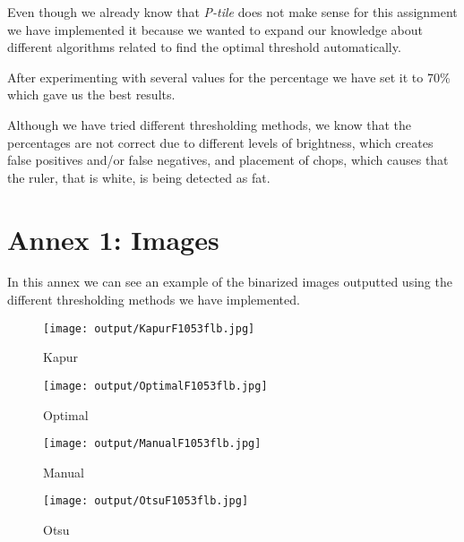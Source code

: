 \documentclass[12]{article}
\begin{document}
Even though we already know that \textit{P-tile} does not make sense for this assignment we have implemented it because we wanted to expand our knowledge about different algorithms related to find the optimal threshold automatically. 

After experimenting with several values for the percentage we have set it to 70\% which gave us the best results.
\\
\medskip

Although we have tried different thresholding methods, we know that the percentages are not correct due to different levels of brightness, which creates false positives and/or false negatives, and placement of chops, which causes that the ruler, that is white, is being detected as fat. 

\newpage
\section{Annex 1: Images}

In this annex we can see an example of the binarized images outputted using the different thresholding methods we have implemented. 
\\
\bigskip
 
\begin{figure}[H]
\centering  
  \texttt{[image: output/KapurF1053flb.jpg]}
    \vspace*{-1.3cm}
  \caption{Kapur}
  \label{fig:Kapur}
\end{figure}
\begin{figure}[H]
\centering
  \texttt{[image: output/OptimalF1053flb.jpg]}
  \vspace*{-1.3cm}  
  \caption{Optimal}
  \label{fig:Optimal}
\end{figure}
\begin{figure}[H]
\centering  
  \texttt{[image: output/ManualF1053flb.jpg]}
   \vspace*{-1.3cm}
  \caption{Manual}
  \label{fig:Manual}

\end{figure}
\begin{figure}[H]
\centering
  \texttt{[image: output/OtsuF1053flb.jpg]}
  \vspace*{-1.3cm} 
  \caption{Otsu}
  \label{fig:Otsu}
\end{figure}
\end{document}
